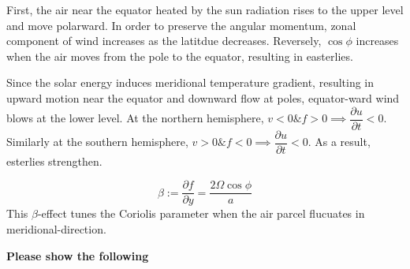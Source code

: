 \documentclass[11pt,a4paper]{article}
\begin{document}
\begin{solution}
First, the air near the equator heated by the sun radiation rises to the upper level and move polarward. In order to preserve the angular momentum, zonal component of wind increases as the latitdue decreases. Reversely, $\cos \phi$ increases when the air moves from the pole to the equator, resulting in easterlies. 
\end{solution}

\begin{solution}
Since the solar energy induces meridional temperature gradient, resulting in upward motion near the equator and downward flow at poles, equator-ward wind blows at the lower level. At the northern hemisphere, $v<0 \& f>0 \implies \dfrac{\partial u}{\partial t}<0$. Similarly at the southern hemisphere, $v>0 \& f<0 \implies \dfrac{\partial u}{\partial t}<0$. As a result, esterlies strengthen.
\end{solution}

\begin{solution}
$$\beta := \frac{\partial f}{\partial y}= \frac{2\Omega \cos \phi}{a}$$
This $\beta$-effect tunes the Coriolis parameter when the air parcel flucuates in meridional-direction. 
\end{solution}

\newpage
\noindent\textbf{Please show the following}
\end{document}
